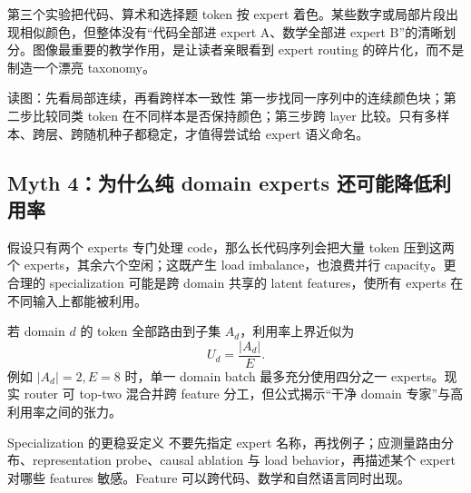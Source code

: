 第三个实验把代码、算术和选择题 token 按 expert 着色。某些数字或局部片段出现相似颜色，但整体没有“代码全部进 expert A、数学全部进 expert B”的清晰划分。图像最重要的教学作用，是让读者亲眼看到 expert routing 的碎片化，而不是制造一个漂亮 taxonomy。


\begin{knowledgebox}{读图：先看局部连续，再看跨样本一致性}
第一步找同一序列中的连续颜色块；第二步比较同类 token 在不同样本是否保持颜色；第三步跨 layer 比较。只有多样本、跨层、跨随机种子都稳定，才值得尝试给 expert 语义命名。
\end{knowledgebox}


\subsection{Myth 4：为什么纯 domain experts 还可能降低利用率}

假设只有两个 experts 专门处理 code，那么长代码序列会把大量 token 压到这两个 experts，其余六个空闲；这既产生 load imbalance，也浪费并行 capacity。更合理的 specialization 可能是跨 domain 共享的 latent features，使所有 experts 在不同输入上都能被利用。


若 domain $d$ 的 token 全部路由到子集 $A_d$，利用率上界近似为
\[
U_d=\frac{|A_d|}{E}.
\]
例如 $|A_d|=2,E=8$ 时，单一 domain batch 最多充分使用四分之一 experts。现实 router 可 top-two 混合并跨 feature 分工，但公式揭示“干净 domain 专家”与高利用率之间的张力。

\begin{importantbox}{Specialization 的更稳妥定义}
不要先指定 expert 名称，再找例子；应测量路由分布、representation probe、causal ablation 与 load behavior，再描述某个 expert 对哪些 features 敏感。Feature 可以跨代码、数学和自然语言同时出现。
\end{importantbox}


